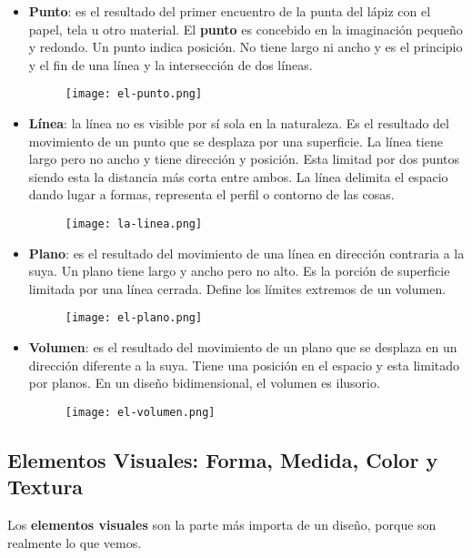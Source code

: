 \begin{itemize}
    \item \textbf{Punto}: es el resultado del primer encuentro de la punta del lápiz con el papel, tela u otro material. El \textbf{punto} es concebido en la imaginación pequeño y redondo. Un punto indica posición. No tiene largo ni ancho y es el principio y el fin de una línea y la intersección de dos líneas.

    \begin{figure}[H]
        \centering
        \texttt{[image: el-punto.png]}
    \end{figure}

    \item \textbf{Línea}: la línea no es visible por sí sola en la naturaleza. Es el resultado del movimiento de un punto que se desplaza por una superficie. La línea tiene largo pero no ancho y tiene dirección y posición. Esta limitad por dos puntos siendo esta la distancia más corta entre ambos. La línea delimita el espacio dando lugar a formas, representa el perfil o contorno de las cosas.

    \begin{figure}[H]
        \centering
        \texttt{[image: la-linea.png]}
    \end{figure}

    \item \textbf{Plano}: es el resultado del movimiento de una línea en dirección contraria a la suya. Un plano tiene largo y ancho pero no alto. Es la porción de superficie limitada por una línea cerrada. Define los límites extremos de un volumen.

    \begin{figure}[H]
        \centering
        \texttt{[image: el-plano.png]}
    \end{figure}

    \item \textbf{Volumen}: es el resultado del movimiento de un plano que se desplaza en un dirección diferente a la suya. Tiene una posición en el espacio y esta limitado por planos. En un diseño bidimensional, el volumen es ilusorio.

    \begin{figure}[H]
        \centering
        \texttt{[image: el-volumen.png]}
    \end{figure}
\end{itemize}

\subsection{Elementos Visuales: Forma, Medida, Color y Textura}
Los \textbf{elementos visuales} son la parte más importa de un diseño, porque son realmente lo que vemos.

